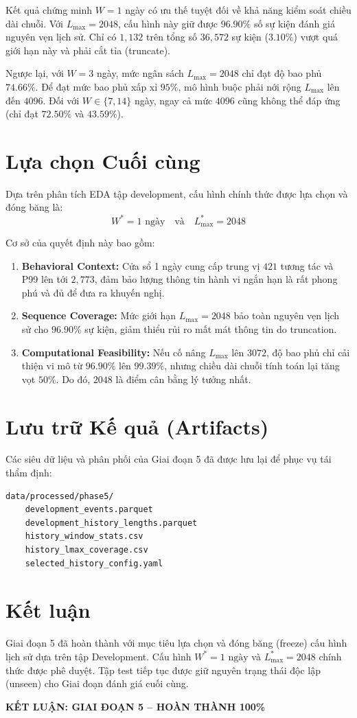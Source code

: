 \documentclass[12pt,a4paper]{article}
\begin{document}
Kết quả chứng minh $W=1$ ngày có ưu thế tuyệt đối về khả năng kiểm soát chiều dài chuỗi. Với $L_{\max}=2048$, cấu hình này giữ được $96.90\%$ số sự kiện đánh giá nguyên vẹn lịch sử. Chỉ có $1,132$ trên tổng số $36,572$ sự kiện ($3.10\%$) vượt quá giới hạn này và phải cắt tỉa (truncate).

Ngược lại, với $W=3$ ngày, mức ngân sách $L_{\max}=2048$ chỉ đạt độ bao phủ $74.66\%$. Để đạt mức bao phủ xấp xỉ $95\%$, mô hình buộc phải nới rộng $L_{\max}$ lên đến $4096$. Đối với $W \in \{7, 14\}$ ngày, ngay cả mức $4096$ cũng không thể đáp ứng (chỉ đạt $72.50\%$ và $43.59\%$).

\section{Lựa chọn Cuối cùng}
Dựa trên phân tích EDA tập development, cấu hình chính thức được lựa chọn và đóng băng là:
\[
\boxed{W^* = 1\text{ ngày}} \quad \text{và} \quad \boxed{L_{\max}^* = 2048}
\]

Cơ sở của quyết định này bao gồm:
\begin{enumerate}
    \item \textbf{Behavioral Context:} Cửa sổ 1 ngày cung cấp trung vị $421$ tương tác và P99 lên tới $2,773$, đảm bảo lượng thông tin hành vi ngắn hạn là rất phong phú và đủ để đưa ra khuyến nghị.
    \item \textbf{Sequence Coverage:} Mức giới hạn $L_{\max}=2048$ bảo toàn nguyên vẹn lịch sử cho $96.90\%$ sự kiện, giảm thiểu rủi ro mất mát thông tin do truncation.
    \item \textbf{Computational Feasibility:} Nếu cố nâng $L_{\max}$ lên $3072$, độ bao phủ chỉ cải thiện vi mô từ $96.90\%$ lên $99.39\%$, nhưng chiều dài chuỗi tính toán lại tăng vọt $50\%$. Do đó, $2048$ là điểm cân bằng lý tưởng nhất.
\end{enumerate}

\section{Lưu trữ Kế quả (Artifacts)}
Các siêu dữ liệu và phân phối của Giai đoạn 5 đã được lưu lại để phục vụ tái thẩm định:
\begin{verbatim}
data/processed/phase5/
    development_events.parquet
    development_history_lengths.parquet
    history_window_stats.csv
    history_lmax_coverage.csv
    selected_history_config.yaml
\end{verbatim}

\section{Kết luận}
Giai đoạn 5 đã hoàn thành với mục tiêu lựa chọn và đóng băng (freeze) cấu hình lịch sử dựa trên tập Development. Cấu hình $W^*=1\text{ ngày}$ và $L_{\max}^*=2048$ chính thức được phê duyệt. Tập test tiếp tục được giữ nguyên trạng thái độc lập (unseen) cho Giai đoạn đánh giá cuối cùng.

\vspace{10pt}
\begin{center}
\large\textbf{KẾT LUẬN: GIAI ĐOẠN 5 -- HOÀN THÀNH 100\%}
\end{center}
\end{document}
